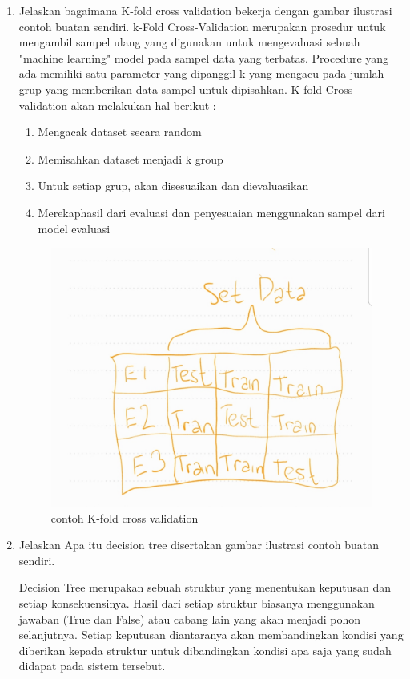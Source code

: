 \begin{enumerate}
\item Jelaskan bagaimana K-fold cross validation bekerja dengan gambar ilustrasi contoh buatan sendiri.
k-Fold Cross-Validation merupakan prosedur untuk mengambil sampel ulang yang digunakan untuk mengevaluasi sebuah "machine learning" model pada sampel data yang terbatas. Procedure yang ada memiliki satu parameter yang dipanggil k yang mengacu pada jumlah grup yang memberikan data sampel untuk dipisahkan.
K-fold Cross-validation akan melakukan hal berikut : 
\begin{enumerate}
    \item Mengacak dataset secara random
    \item Memisahkan dataset menjadi k group
    \item Untuk setiap grup, akan disesuaikan dan dievaluasikan
    \item Merekaphasil dari evaluasi dan penyesuaian menggunakan sampel dari model evaluasi
\end{enumerate}
\begin{figure}[H]
\centering
\includegraphics[scale=0.2]{figures/1174035/chapter2/kcode.jpeg}
\caption{contoh K-fold cross validation}
\label{contoh}
\end{figure}


\item Jelaskan Apa itu decision tree disertakan gambar ilustrasi contoh buatan sendiri.\par
Decision Tree merupakan sebuah struktur yang menentukan keputusan dan setiap konsekuensinya. Hasil dari setiap struktur biasanya menggunakan jawaban (True dan False) atau cabang lain yang akan menjadi pohon selanjutnya. Setiap keputusan diantaranya akan membandingkan kondisi yang diberikan kepada struktur untuk dibandingkan kondisi apa saja yang sudah didapat pada sistem tersebut. 



\end{enumerate}
